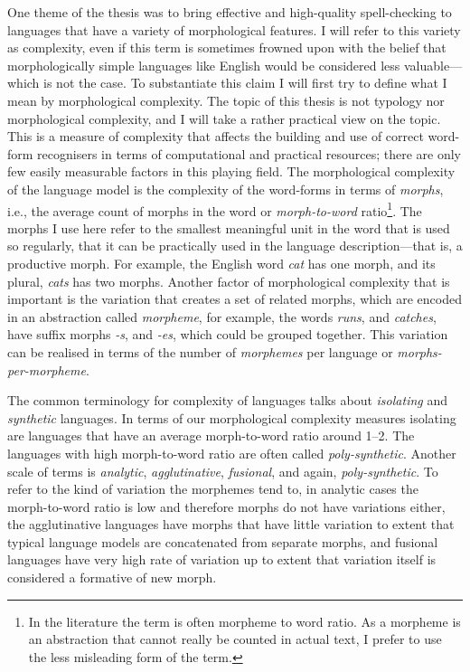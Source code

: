 \documentclass[officiallayout]{unihelcompling}
\begin{document}
One theme of the thesis was to bring effective and high-quality spell-checking
to languages that have a variety of morphological features. I will refer to
this variety as complexity, even if this term is sometimes frowned upon with
the belief that morphologically simple languages like English would be
considered less valuable---which is not the case.  To substantiate this claim I
will first try to define what I mean by morphological complexity. The topic of
this thesis is not typology nor morphological complexity, and I will take a
rather practical view on the topic.  This is a measure of complexity that
affects the building and use of correct word-form recognisers in terms of
computational and practical resources; there are only few easily measurable
factors in this playing field. The morphological complexity of the language model is the complexity of the word-forms
in terms of \emph{morphs}, i.e., the average count of morphs in the word or
\emph{morph-to-word} ratio\footnote{In the literature the term is often morpheme to
    word ratio. As a morpheme is an abstraction that cannot really be counted
    in actual text, I prefer to use the less misleading form of the term.}. The
    morphs I use here refer to the smallest meaningful unit in the word that is
    used so regularly, that it can be practically used in the language
    description---that is, a productive morph. For example, the English word
    \emph{cat} has one morph, and its plural, \emph{cats} has two morphs.
    Another factor of morphological complexity that is important is the
    variation that creates a set of related morphs, which are encoded in an
    abstraction called \emph{morpheme}, for example, the words \emph{runs}, and
    \emph{catches}, have suffix morphs \emph{-s}, and \emph{-es}, which could
    be grouped together. This variation can be realised in terms of the number of
    \emph{morphemes} per language or \emph{morphs-per-morpheme}.

The common terminology for complexity of languages talks about \emph{isolating}
and \emph{synthetic} languages. In terms of our morphological complexity
measures isolating are languages that have an average morph-to-word ratio around
1--2. The languages with high morph-to-word ratio are often called
\emph{poly-synthetic}. Another scale of terms is \emph{analytic},
\emph{agglutinative}, \emph{fusional}, and again, \emph{poly-synthetic}. To
refer to the kind of variation the morphemes tend to, in analytic cases the
morph-to-word ratio is low and therefore morphs do not have variations either,
the agglutinative languages have morphs that have little variation to extent
that typical language models are concatenated from separate morphs, and
fusional languages have very high rate of variation up to extent that variation
itself is considered a formative of new morph. 
\end{document}
